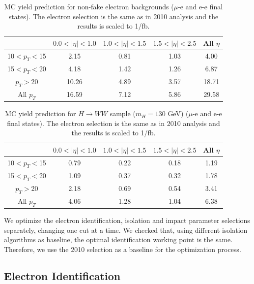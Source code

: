 \begin{table}[!ht]
\begin{center}
\begin{tabular}{|c|ccc|c|} \hline
 & $0.0<|\eta|<1.0$ & $1.0<|\eta|<1.5$ & $1.5<|\eta|<2.5$ & All $\eta$ \\ \hline
10$<p_T<$15 & 2.15 & 0.81 & 1.03 & 4.00 \\
15$<p_T<$20 & 4.18 & 1.42 & 1.26 & 6.87 \\
$p_T>$20    & 10.26& 4.89 & 3.57 & 18.71\\  \hline
All $p_T$   & 16.59& 7.12 & 5.86 & 29.58 \\ \hline
\end{tabular}
\caption{MC yield prediction for non-fake electron backgrounds ($\mu$-e and e-e final states). 
The electron selection is the same as in 2010 analysis and the results is scaled to 1/fb.
\label{tab:nonfakeyieds}}
\end{center}
\end{table}

\begin{table}[!ht]
\begin{center}
\begin{tabular}{|c|ccc|c|} \hline
 & $0.0<|\eta|<1.0$ & $1.0<|\eta|<1.5$ & $1.5<|\eta|<2.5$ & All $\eta$ \\ \hline
10$<p_T<$15 & 0.79 & 0.22 & 0.18 & 1.19 \\
15$<p_T<$20 & 1.09 & 0.37 & 0.32 & 1.78 \\
$p_T>$20    & 2.18 & 0.69 & 0.54 & 3.41 \\  \hline
All $p_T$   & 4.06 & 1.28 & 1.04 & 6.38 \\ \hline
\end{tabular}
\caption{MC yield prediction for $H\rightarrow WW$ sample ($m_H=130$ GeV) ($\mu$-e and e-e final states). 
The electron selection is the same as in 2010 analysis and the results is scaled to 1/fb.
\label{tab:hww130yieds}}
\end{center}
\end{table}

We optimize the electron identification, isolation and impact parameter selections separately, changing one cut at a time.
We checked that, using different isolation algorithms as baseline, the optimal identification working point is the same.
Therefore, we use the 2010 selection as a baseline for the optimization process.

\subsection{Electron Identification}

